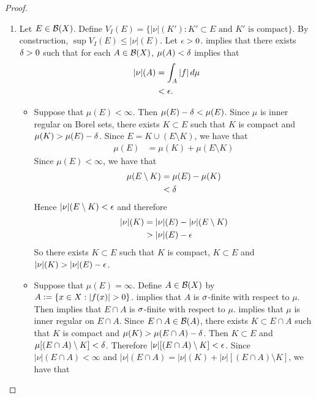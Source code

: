 \documentclass{book}
\begin{document}
	\begin{proof}\
		\begin{enumerate}
			\item Let $E \in \mathcal{B}(X)$. Define $V_I(E) = \{|\nu|(K'): \text{$K' \subset E$ and $K'$ is compact}\}$. By construction, $\sup V_I(E) \leq |\nu|(E)$. Let $\epsilon > 0$.  implies that there exists $\delta > 0$ such that for each $A \in \mathcal{B}(X)$, $\mu(A)< \delta$ implies that 
			\begin{align*}
				|\nu|(A)
				& = \int_A |f| \, d \mu \\
				& < \epsilon.
			\end{align*}
			\begin{itemize}
				\item Suppose that $\mu(E) < \infty$. Then $\mu(E) - \delta < \mu(E)$. Since $\mu$ is inner regular on Borel sets, there exists $K \subset E$ such that $K$ is compact and $\mu(K) > \mu(E) - \delta$.
				Since $E = K \cup (E \setminus K)$, we have that 
				\begin{align*}
					\mu(E)
					& = \mu(K) + \mu(E \setminus K)
				\end{align*} 
				Since $\mu(E) < \infty$, we have that  
				\begin{align*}
					\mu(E \setminus K)
					& = \mu(E) - \mu(K) \\
					& < \delta 
				\end{align*}
				Hence $|\nu|(E \setminus K) < \epsilon$ and therefore
				\begin{align*}
					|\nu|(K)
					& = |\nu|(E) - |\nu|(E \setminus K) \\
					& > |\nu|(E) - \epsilon
				\end{align*} 
				So there exists $K \subset E$ such that $K$ is compact, $K \subset E$ and $|\nu|(K) > |\nu|(E) - \epsilon$.
				\item Suppose that $\mu(E) = \infty$. Define $A \in \mathcal{B}(X)$ by $A \vcentcolon= \{x \in X: |f(x)| > 0\}$.  implies that $A$ is $\sigma$-finite with respect to $\mu$. Then  implies that $E \cap A$ is $\sigma$-finite with respect to $\mu$.  implies that $\mu$ is inner regular on $E \cap A$. Since $E \cap A \in \mathcal{B}(A)$, there exists $K \subset E \cap A$ such that $K$ is compact and $\mu(K) > \mu(E \cap A) - \delta$. Then $K \subset E$ and $\mu[(E \cap A) \setminus K] < \delta$. Therefore $|\nu|[(E \cap A) \setminus K] < \epsilon$. Since $|\nu|(E \cap A) < \infty$ and $|\nu|(E \cap A) = |\nu|(K) + |\nu|[(E \cap A) \setminus K]$, we have that 

\end{itemize}
\end{enumerate}
\end{proof}
\end{document}
